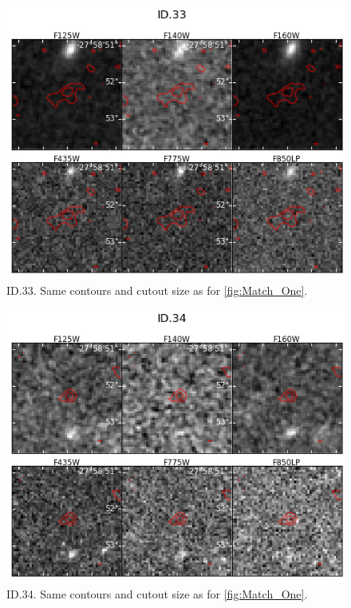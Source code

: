 \begin{figure}[tbp]
\centering \includegraphics[width=160mm]{Matched/ASPECS_Cutout_32.jpg}
\caption{ID.33. Same contours and cutout size as for \ref{fig:Match_One}.}
\label{fig:Match_Three}
\end{figure}

\begin{figure}[tbp]
\centering \includegraphics[width=160mm]{Matched/ASPECS_Cutout_33.jpg}
\caption{ID.34. Same contours and cutout size as for \ref{fig:Match_One}.}
\label{fig:Match_Three}
\end{figure}

